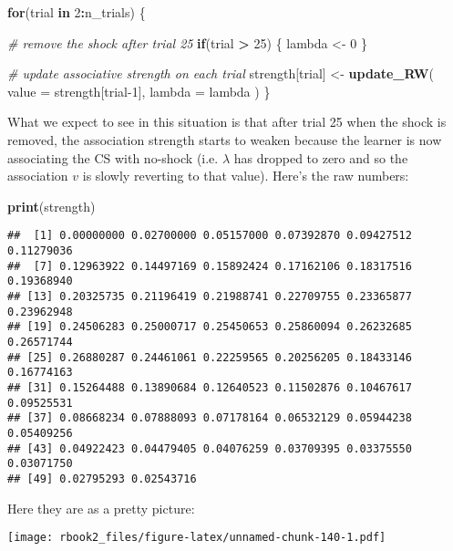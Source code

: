\documentclass[]{book}
\newenvironment{Shaded}{\begin{snugshade}}{\end{snugshade}}
\newcommand{\CommentTok}[1]{\textcolor[rgb]{0.56,0.35,0.01}{\textit{#1}}}
\newcommand{\ControlFlowTok}[1]{\textcolor[rgb]{0.13,0.29,0.53}{\textbf{#1}}}
\newcommand{\DataTypeTok}[1]{\textcolor[rgb]{0.13,0.29,0.53}{#1}}
\newcommand{\DecValTok}[1]{\textcolor[rgb]{0.00,0.00,0.81}{#1}}
\newcommand{\KeywordTok}[1]{\textcolor[rgb]{0.13,0.29,0.53}{\textbf{#1}}}
\newcommand{\NormalTok}[1]{#1}
\newcommand{\OperatorTok}[1]{\textcolor[rgb]{0.81,0.36,0.00}{\textbf{#1}}}
\newcommand{\StringTok}[1]{\textcolor[rgb]{0.31,0.60,0.02}{#1}}
\begin{document}
\begin{Shaded}
\begin{Highlighting}[]
\ControlFlowTok{for}\NormalTok{(trial }\ControlFlowTok{in} \DecValTok{2}\OperatorTok{:}\NormalTok{n_trials) \{}
  
  \CommentTok{# remove the shock after trial 25}
  \ControlFlowTok{if}\NormalTok{(trial }\OperatorTok{>}\StringTok{ }\DecValTok{25}\NormalTok{) \{}
\NormalTok{    lambda <-}\StringTok{ }\DecValTok{0}
\NormalTok{  \}}
  
  \CommentTok{# update associative strength on each trial}
\NormalTok{  strength[trial] <-}\StringTok{ }\KeywordTok{update_RW}\NormalTok{(}
    \DataTypeTok{value =}\NormalTok{ strength[trial}\DecValTok{-1}\NormalTok{],}
    \DataTypeTok{lambda =}\NormalTok{ lambda}
\NormalTok{  )}
\NormalTok{\}}
\end{Highlighting}
\end{Shaded}

What we expect to see in this situation is that after trial 25 when the shock is removed, the association strength starts to weaken because the learner is now associating the CS with no-shock (i.e. \(\lambda\) has dropped to zero and so the association \(v\) is slowly reverting to that value). Here's the raw numbers:

\begin{Shaded}
\begin{Highlighting}[]
\KeywordTok{print}\NormalTok{(strength)}
\end{Highlighting}
\end{Shaded}

\begin{verbatim}
##  [1] 0.00000000 0.02700000 0.05157000 0.07392870 0.09427512 0.11279036
##  [7] 0.12963922 0.14497169 0.15892424 0.17162106 0.18317516 0.19368940
## [13] 0.20325735 0.21196419 0.21988741 0.22709755 0.23365877 0.23962948
## [19] 0.24506283 0.25000717 0.25450653 0.25860094 0.26232685 0.26571744
## [25] 0.26880287 0.24461061 0.22259565 0.20256205 0.18433146 0.16774163
## [31] 0.15264488 0.13890684 0.12640523 0.11502876 0.10467617 0.09525531
## [37] 0.08668234 0.07888093 0.07178164 0.06532129 0.05944238 0.05409256
## [43] 0.04922423 0.04479405 0.04076259 0.03709395 0.03375550 0.03071750
## [49] 0.02795293 0.02543716
\end{verbatim}

Here they are as a pretty picture:

\texttt{[image: rbook2\_files/figure-latex/unnamed-chunk-140-1.pdf]}
\end{document}
